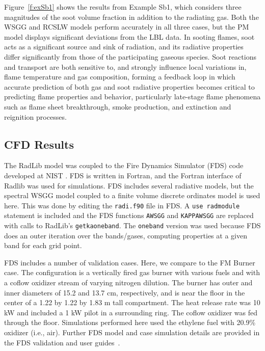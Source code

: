 \documentclass[preprint,12pt]{elsarticle}
\begin{document}
    Figure~\ref{f:exSb1} shows the results from Example Sb1, which considers three magnitudes of the soot volume fraction in addition to the radiating gas. Both the WSGG and RCSLW models perform accurately in all three cases, but the PM model displays significant deviations from the LBL data. In sooting flames, soot acts as a significant source and sink of radiation, and its radiative properties differ significantly from those of the participating gaseous species. Soot reactions and transport are both sensitive to, and strongly influence local variations in, flame temperature and gas composition, forming a feedback loop in which accurate prediction of both gas and soot radiative properties becomes critical to predicting flame properties and behavior, particularly late-stage flame phenomena such as flame sheet breakthrough, smoke production, and extinction and reignition processes.



    \subsection{CFD Results} \label{s:cfd}

    The RadLib model was coupled to the Fire Dynamics Simulator (FDS) code developed at NIST \cite{FDS}. FDS is
    written in Fortran, and the Fortran interface of Radlib was used for simulations. FDS includes several radiative
    models, but the spectral WSGG model coupled to a finite volume discrete ordinates model is used here. This was
    done by editing the \texttt{radi.f90} file in FDS. A \texttt{use rad\textunderscore module} statement is included
    and the FDS functions \texttt{A\textunderscore WSGG} and \texttt{KAPPA\textunderscore WSGG} are replaced with calls
    to RadLib's \texttt{get\textunderscore k\textunderscore a\textunderscore oneband}. The \texttt{oneband} version was
    used because FDS does an outer iteration over the bands/gases, computing properties at a given band for each grid point.

    FDS includes a number of validation cases. Here, we compare to the FM Burner case. The configuration is a vertically fired gas burner with various fuels and with a coflow oxidizer stream of varying nitrogen dilution. The burner has outer and inner diameters of 15.2 and 13.7 cm, respectively, and is near the floor in the center of a 1.22 by 1.22 by 1.83 m tall compartment. The heat release rate was 10 kW and included a 1 kW pilot in a surrounding ring. The coflow oxidizer was fed through the floor. Simulations performed here used the ethylene fuel with 20.9\%  oxidizer (i.e., air). Further FDS model and case simulation details are provided in the FDS validation and user guides~\cite{FDS}.
\end{document}
